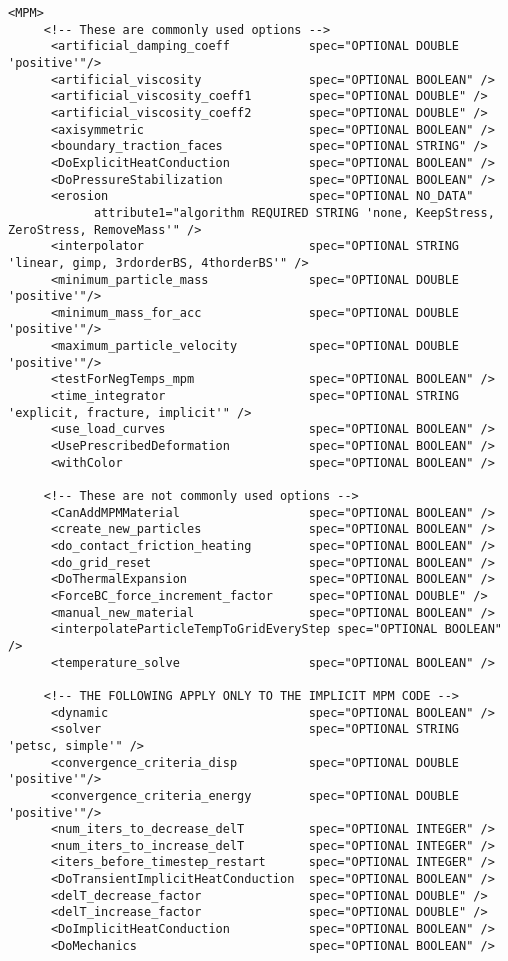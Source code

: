 \begin{Verbatim}[fontsize=\footnotesize]
    <MPM>
     <!-- These are commonly used options -->
      <artificial_damping_coeff           spec="OPTIONAL DOUBLE 'positive'"/>
      <artificial_viscosity               spec="OPTIONAL BOOLEAN" />
      <artificial_viscosity_coeff1        spec="OPTIONAL DOUBLE" />
      <artificial_viscosity_coeff2        spec="OPTIONAL DOUBLE" />
      <axisymmetric                       spec="OPTIONAL BOOLEAN" />
      <boundary_traction_faces            spec="OPTIONAL STRING" />
      <DoExplicitHeatConduction           spec="OPTIONAL BOOLEAN" />
      <DoPressureStabilization            spec="OPTIONAL BOOLEAN" />
      <erosion                            spec="OPTIONAL NO_DATA"
            attribute1="algorithm REQUIRED STRING 'none, KeepStress, ZeroStress, RemoveMass'" />
      <interpolator                       spec="OPTIONAL STRING 'linear, gimp, 3rdorderBS, 4thorderBS'" />
      <minimum_particle_mass              spec="OPTIONAL DOUBLE 'positive'"/>
      <minimum_mass_for_acc               spec="OPTIONAL DOUBLE 'positive'"/>
      <maximum_particle_velocity          spec="OPTIONAL DOUBLE 'positive'"/>
      <testForNegTemps_mpm                spec="OPTIONAL BOOLEAN" />
      <time_integrator                    spec="OPTIONAL STRING 'explicit, fracture, implicit'" />
      <use_load_curves                    spec="OPTIONAL BOOLEAN" />
      <UsePrescribedDeformation           spec="OPTIONAL BOOLEAN" />
      <withColor                          spec="OPTIONAL BOOLEAN" />

     <!-- These are not commonly used options -->
      <CanAddMPMMaterial                  spec="OPTIONAL BOOLEAN" />
      <create_new_particles               spec="OPTIONAL BOOLEAN" />
      <do_contact_friction_heating        spec="OPTIONAL BOOLEAN" />
      <do_grid_reset                      spec="OPTIONAL BOOLEAN" />
      <DoThermalExpansion                 spec="OPTIONAL BOOLEAN" />
      <ForceBC_force_increment_factor     spec="OPTIONAL DOUBLE" />
      <manual_new_material                spec="OPTIONAL BOOLEAN" />
      <interpolateParticleTempToGridEveryStep spec="OPTIONAL BOOLEAN" />
      <temperature_solve                  spec="OPTIONAL BOOLEAN" />

     <!-- THE FOLLOWING APPLY ONLY TO THE IMPLICIT MPM CODE -->
      <dynamic                            spec="OPTIONAL BOOLEAN" />
      <solver                             spec="OPTIONAL STRING 'petsc, simple'" />
      <convergence_criteria_disp          spec="OPTIONAL DOUBLE 'positive'"/>
      <convergence_criteria_energy        spec="OPTIONAL DOUBLE 'positive'"/>
      <num_iters_to_decrease_delT         spec="OPTIONAL INTEGER" />
      <num_iters_to_increase_delT         spec="OPTIONAL INTEGER" />
      <iters_before_timestep_restart      spec="OPTIONAL INTEGER" />
      <DoTransientImplicitHeatConduction  spec="OPTIONAL BOOLEAN" />
      <delT_decrease_factor               spec="OPTIONAL DOUBLE" />
      <delT_increase_factor               spec="OPTIONAL DOUBLE" />
      <DoImplicitHeatConduction           spec="OPTIONAL BOOLEAN" />
      <DoMechanics                        spec="OPTIONAL BOOLEAN" />


\end{Verbatim}

